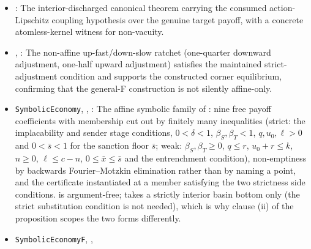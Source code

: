 \begin{itemize}[leftmargin=1.4em,itemsep=1pt]
: The general closed-loop law (sec:existence:machinery): the state-dependent-drift transfer operator with its Feller adjoint; Krylov--Bogolyubov existence for every continuous drift; and, conditionally on a drift Lipschitz modulus $L\in(0,1)$, a unique invariant law with the geometric bound $L^n$.  The equilibrium instantiation gives a stationary law when the equilibrium-induced drift is continuous.  The example economy with a positive stage slope then marks the honest uniqueness boundary: its closed-loop factor is exactly $1+\delta/8>1$, so the contraction route is provably unavailable.  The affine compatibility lemma makes the affine box-transfer operator the drift $g_\delta(x)=(1-\delta)x+\delta$ specialization by definitional equality.
\item {}: The interior-discharged canonical theorem carrying the consumed action-Lipschitz coupling hypothesis over the genuine target payoff, with a concrete atomless-kernel witness for non-vacuity.
\item {}, : The non-affine up-fast/down-slow ratchet (one-quarter downward adjustment, one-half upward adjustment) satisfies the maintained strict-adjustment condition and supports the constructed corner equilibrium, confirming that the general-F construction is not silently affine-only.
\item \texttt{SymbolicEconomy}, ,
: The affine symbolic
family of : nine free payoff coefficients with
membership cut out by finitely many inequalities (strict: the implacability
and sender stage conditions, $0<\delta<1$, $\beta_S,\beta_T<1$, $q,u_0,\ell>0$
and $0<\bar s<1$ for the sanction floor $\bar s$; weak: $\beta_S,\beta_T\ge0$,
$q\le r$, $u_0+r\le k$, $n\ge0$, $\ell\le c-n$, $0\le\bar x\le\bar s$ and
the entrenchment condition), non-emptiness by
backwards Fourier--Motzkin elimination rather than by naming a point, and
the certificate instantiated at a member satisfying the two strictness
side conditions.  is argument-free; 
takes a strictly interior basin bottom only (the strict substitution condition is
not needed), which is why clause
(ii) of the proposition scopes the two forms differently.
\item \texttt{SymbolicEconomyF}, ,

\end{itemize}
